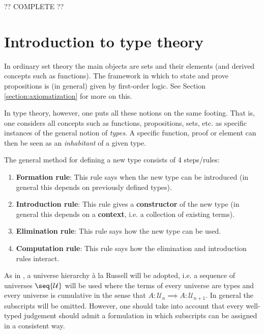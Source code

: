     ?? COMPLETE ??

\section{Introduction to type theory}

    In ordinary set theory the main objects are sets and their elements (and derived concepts such as functions). The framework in which to state and prove propositions is (in general) given by first-order logic. See Section \ref{section:axiomatization} for more on this.

    In type theory, however, one puts all these notions on the same footing. That is, one considers all concepts such as functions, propositions, sets, etc. as specific instances of the general notion of \textit{types}. A specific function, proof or element can then be seen as an \textit{inhabitant} of a given type.

    \begin{method}
        The general method for defining a new type consists of 4 steps/rules:
        \begin{enumerate}
            \item \textbf{Formation rule}: This rule says when the new type can be introduced (in general this depends on previously defined types).
            \item \textbf{Introduction rule}: This rule gives a \textbf{constructor} of the new type (in general this depends on a \textbf{context}, i.e. a collection of existing terms).
            \item \textbf{Elimination rule}: This rule says how the new type can be used.
            \item \textbf{Computation rule}: This rule says how the elimination and introduction rules interact.
        \end{enumerate}
    \end{method}

    As in \cite{hott}, a universe hierarchy \`a la Russell will be adopted, i.e. a sequence of universes $\seq{\mathcal{U}}$ will be used where the terms of every universe are types and every universe is cumulative in the sense that $A:\mathcal{U}_n\implies A:\mathcal{U}_{n+1}$. In general the subscripts will be omitted. However, one should take into account that every well-typed judgement should admit a formulation in which subscripts can be assigned in a consistent way.

